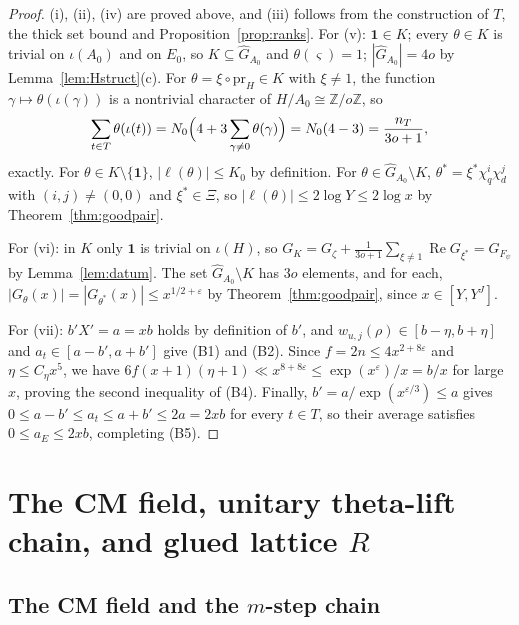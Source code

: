 \documentclass[11pt]{amsart}
\newcommand{\Z}{\mathbb{Z}}
\newcommand{\eps}{\varepsilon}
\newcommand{\re}{\operatorname{Re}}
\newcommand{\Gh}{\widehat{G}}
\theoremstyle{plain}
\theoremstyle{definition}
\numberwithin{equation}{section}
\begin{document}
\begin{proof}
(i), (ii), (iv) are proved above, and (iii) follows from the construction of $T$, the thick set
bound and Proposition~\ref{prop:ranks}. For (v): $\mathbf1\in K$; every $\theta\in K$ is trivial on
$\iota(A_0)$ and on $E_0$, so $K\subseteq\Gh_{A_0}$ and $\theta(\varsigma)=1$;
$|\Gh_{A_0}|=4o$ by Lemma~\ref{lem:Hstruct}(c). For $\theta=\xi\circ\mathrm{pr}_H\in K$ with
$\xi\ne1$, the function $\gamma\mapsto\theta(\iota(\gamma))$ is a nontrivial character of
$H/A_0\cong\Z/o\Z$, so
\[
\sum_{t\in T}\theta(\iota(t))=N_0\Bigl(4+3\sum_{\gamma\ne0}\theta(\gamma)\Bigr)=N_0(4-3)=\frac{n_T}{3o+1},
\]
exactly. For $\theta\in K\setminus\{\mathbf1\}$, $|\ell(\theta)|\le K_0$ by definition. For
$\theta\in\Gh_{A_0}\setminus K$, $\theta^\ast=\xi^\ast\chi_q^i\chi_d^j$ with $(i,j)\ne(0,0)$ and
$\xi^\ast\in\Xi$, so $|\ell(\theta)|\le2\log Y\le2\log x$ by Theorem~\ref{thm:goodpair}.

For (vi): in $K$ only $\mathbf1$ is trivial on $\iota(H)$, so
$G_K=G_\zeta+\frac1{3o+1}\sum_{\xi\ne1}\re G_{\xi^\ast}=G_{F_\psi}$ by Lemma~\ref{lem:datum}. The set
$\Gh_{A_0}\setminus K$ has $3o$ elements, and for each, $|G_\theta(x)|=|G_{\theta^\ast}(x)|\le x^{1/2+\eps}$
by Theorem~\ref{thm:goodpair}, since $x\in[Y,Y^J]$.

For (vii): $b'X'=a=xb$ holds by definition of $b'$, and $w_{u,j}(\rho)\in[b-\eta,b+\eta]$ and
$a_t\in[a-b',a+b']$ give \textup{(B1)} and \textup{(B2)}. Since $f=2n\le 4x^{2+8\eps}$ and
$\eta\le C_\eta x^5$, we have $6f(x+1)(\eta+1)\ll x^{8+8\eps}\le\exp(x^\eps)/x=b/x$ for large
$x$, proving the second inequality of \textup{(B4)}. Finally, $b'=a/\exp(x^{\eps/3})\le a$ gives
$0\le a-b'\le a_t\le a+b'\le 2a=2xb$ for every $t\in T$, so their average satisfies
$0\le a_E\le 2xb$, completing \textup{(B5)}.
\end{proof}

\section{The CM field, unitary theta-lift chain, and glued lattice \texorpdfstring{$R$}{R}}\label{sec:glued}

\subsection{The CM field and the $m$-step chain}
\end{document}
